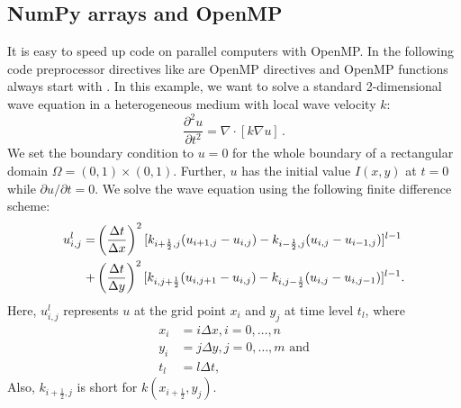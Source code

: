 \subsection{NumPy arrays and OpenMP}

It is easy to speed up code on parallel computers with OpenMP. In the
following code preprocessor directives like  are OpenMP directives and OpenMP functions always start
with .  In this example, we want to solve a standard
2-dimensional wave equation in a heterogeneous medium with local wave
velocity $k$:
\begin{equation}
\frac{\partial^2u}{\partial t^2} = \nabla \cdot [k\nabla u]\, .
\end{equation}
We set the boundary condition to $u = 0$ for the whole boundary of a
rectangular domain $\Omega = (0,1) \times (0,1)$. Further, $u$ has the initial
value $I(x,y)$ at $t = 0$ while $\partial u/ \partial t = 0$.
We solve the wave equation using the following finite difference scheme:
\begin{align}
u_{i,j}^l =
&\left(\frac{\Delta t}{\Delta x}\right)^2
[k_{i+\frac{1}{2},j}(u_{i+1,j} - u_{i,j}) - k_{i-\frac{1}{2},j}(u_{i,j} - u_{i-1,j})]^{l-1}\notag\\
+&\left(\frac{\Delta t}{\Delta y}\right)^2
[k_{i,j+\frac{1}{2}}(u_{i,j+1} - u_{i,j}) - k_{i,j-\frac{1}{2}}(u_{i,j} - u_{i,j-1})]^{l-1}.
\end{align}\label{u}
Here, $u_{i,j}^l$ represents $u$ at the grid point $x_i$ and $y_j$ at
time level $t_l$, where
\begin{align}
x_i &= i\Delta x, i = 0, \ldots, n\\
y_i &= j\Delta y, j = 0, \ldots, m\textrm{ and}\\
t_l &= l\Delta t,
\end{align}
Also, $k_{i+\frac{1}{2},j}$ is short for $k(x_{i+\frac{1}{2}},y_j)$.

